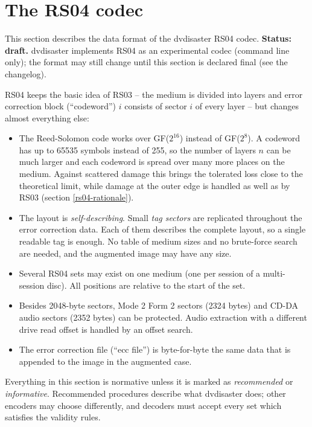 \section{The RS04 codec}
\label{rs04}
\sloppy

This section describes the data format of the dvdisaster RS04 codec.
{\bf Status: draft.} dvdisaster implements RS04 as an experimental codec
(command line only); the format may still change until this section is
declared final (see the changelog).

\medskip

RS04 keeps the basic idea of RS03 -- the medium is divided into layers and
error correction block (``codeword'') $i$ consists of sector $i$ of every
layer -- but changes almost everything else:

\begin{itemize}
\item The Reed-Solomon code works over GF($2^{16}$) instead of GF($2^8$).
  A codeword has up to 65535 symbols instead of 255, so the number of layers
  $n$ can be much larger and each codeword is spread over many more places on
  the medium. Against scattered damage this brings the tolerated loss close
  to the theoretical limit, while damage at the outer edge is handled as well
  as by RS03 (section \ref{rs04-rationale}).
\item The layout is {\em self-describing}. Small {\em tag sectors} are
  replicated throughout the error correction data. Each of them describes the
  complete layout, so a single readable tag is enough. No table of medium
  sizes and no brute-force search are needed, and the augmented image may
  have any size.
\item Several RS04 sets may exist on one medium (one per session of a
  multi-session disc). All positions are relative to the start of the set.
\item Besides 2048-byte sectors, Mode 2 Form 2 sectors (2324 bytes) and
  CD-DA audio sectors (2352 bytes) can be protected. Audio extraction with
  a different drive read offset is handled by an offset search.
\item The error correction file (``ecc file'') is byte-for-byte the same
  data that is appended to the image in the augmented case.
\end{itemize}

Everything in this section is normative unless it is marked as
{\em recommended} or {\em informative}. Recommended procedures describe
what dvdisaster does; other encoders may choose differently, and decoders
must accept every set which satisfies the validity rules.

